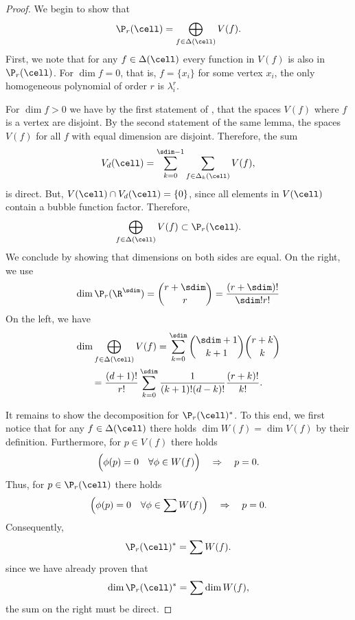 \begin{proof}
  We begin to show that
  \begin{gather}
    \P_r(\cell) = \bigoplus_{f\in\Delta(\cell)}V(f).
  \end{gather}
  First, we note that for any $f\in\Delta(\cell)$ every function in $V(f)$
  is also in $\P_r(\cell)$.  For $\dim f=0$, that is, $f=\{x_i\}$ for some
  vertex $x_i$, the only homogeneous polynomial of order $r$ is $\lambda_i^r$.

  For $\dim f > 0$ we have by the first statement of
  , that the spaces $V(f)$
  where $f$ is a vertex are disjoint. By the second statement of the
  same lemma, the spaces $V(f)$ for all $f$ with equal dimension are
  disjoint. Therefore, the sum
  \begin{gather}
    V_d(\cell) = \sum_{k=0}^{\sdim-1} \sum_{f\in \Delta_k(\cell)} V(f),
  \end{gather}
  is direct. But, $V(\cell) \cap V_d(\cell) = \{0\}$, since all elements in
  $V(\cell)$ contain a bubble function factor. Therefore,
  \begin{gather}
    \bigoplus_{f\in\Delta(\cell)}V(f) \subset \P_r(\cell).
  \end{gather}
  We conclude by showing that dimensions on both sides are equal.
  On the right, we use
  \begin{gather}
    \dim \P_r(\R^\sdim) = \binom{r+\sdim}{r} = \frac{(r+\sdim)!}{\sdim!r!}
  \end{gather}
  On the left, we have
  \begin{multline}
    \dim \bigoplus_{f\in\Delta(\cell)}V(f) =
    \sum_{k=0}^{\sdim} \binom{\sdim+1}{k+1} \binom{r+k}{k}
    \\
    = \frac{(d+1)!}{r!}
    \sum_{k=0}^{\sdim} \frac{1}{(k+1)!(d-k)!} \frac{(r+k)!}{k!}.
  \end{multline}


  It remains to show the decomposition for $\P_r(\cell)^*$. To this
  end, we first notice that for any $f\in\Delta(\cell)$ there holds
  $\dim W(f) = \dim V(f)$ by their definition. Furthermore, for
  $p\in V(f)$ there holds
  \begin{gather}
    \Bigl(\phi(p) = 0 \quad\forall \phi\in W(f)\Bigr)
    \quad\Rightarrow\quad
    p=0.
  \end{gather}
  Thus, for $p\in \P_r(\cell)$ there holds
  \begin{gather}
    \Bigl(\phi(p) = 0 \quad\forall \phi\in \sum W(f)\Bigr)
    \quad\Rightarrow\quad
    p=0.
  \end{gather}
  Consequently,
  \begin{gather}
    \P_r(\cell)^* = \sum W(f).
  \end{gather}
  since we have already proven that
  \begin{gather}
    \dim \P_r(\cell)^* = \sum \dim W(f),
  \end{gather}
  the sum on the right must be direct.
\end{proof}

